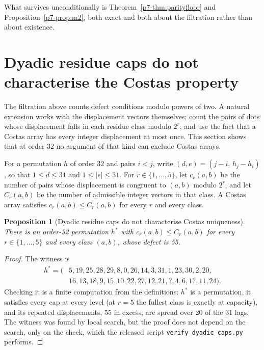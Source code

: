 \documentclass[11pt,a4paper,oneside]{report}
\newtheorem{proposition}[theorem]{Proposition}
\theoremstyle{definition}
\begin{document}
What survives unconditionally is Theorem~\ref{p7-thm:parityfloor} and
Proposition~\ref{p7-prop:m2}, both exact and both about the filtration rather than
about existence.


\section{Dyadic residue caps do not characterise the Costas property}
\label{p7-sec:caps}

The filtration above counts defect conditions modulo powers of two. A natural extension works with the
displacement vectors themselves: count the pairs of dots whose displacement falls in each residue class
modulo $2^r$, and use the fact that a Costas array has every integer displacement at most once. This
section shows that at order 32 no argument of that kind can exclude Costas arrays.

For a permutation $h$ of order 32 and pairs $i<j$, write $(d,e)=(j-i,\,h_j-h_i)$, so that $1\le d\le31$
and $1\le|e|\le31$. For $r\in\{1,\dots,5\}$, let $c_r(a,b)$ be the number of pairs whose displacement is
congruent to $(a,b)$ modulo $2^r$, and let $C_r(a,b)$ be the number of admissible integer vectors in
that class. A Costas array satisfies $c_r(a,b)\le C_r(a,b)$ for every $r$ and every class.

\begin{proposition}[Dyadic residue caps do not characterise Costas uniqueness]
\label{p7-prop:caps}
There is an order-32 permutation $h^\ast$ with $c_r(a,b)\le C_r(a,b)$ for every $r\in\{1,\dots,5\}$ and
every class $(a,b)$, whose defect is 55.
\end{proposition}
\begin{proof}
The witness is
\[
\begin{aligned}
h^\ast=(&5,19,25,28,29,8,0,26,14,3,31,1,23,30,2,20,\\
        &16,13,18,9,15,10,22,27,12,21,7,4,6,17,11,24).
\end{aligned}
\]
Checking it is a finite computation from the definitions: $h^\ast$ is a permutation, it satisfies every
cap at every level (at $r=5$ the fullest class is exactly at capacity), and its repeated displacements,
55 in excess, are spread over 20 of the 31 lags. The witness was found by local search, but the proof
does not depend on the search, only on the check, which the released script
\texttt{verify\_dyadic\_caps.py} performs.
\end{proof}
\end{document}
